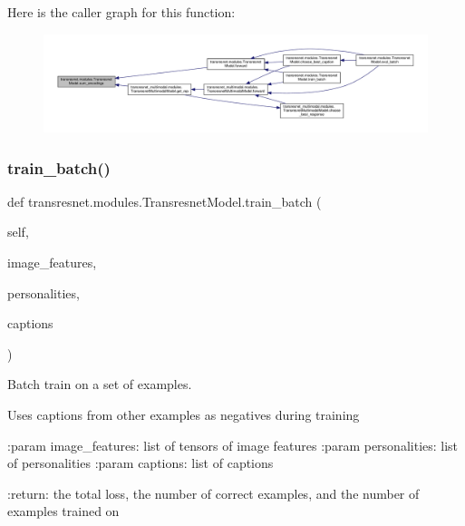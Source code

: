 Here is the caller graph for this function\+:
\nopagebreak
\begin{figure}[H]
\begin{center}
\leavevmode
\includegraphics[width=350pt]{classtransresnet_1_1modules_1_1TransresnetModel_ad510db9128829888d74b02e520cad7b9_icgraph}
\end{center}
\end{figure}
\mbox{\label{classtransresnet_1_1modules_1_1TransresnetModel_aedf5402061ce43a2b594eb9c8a374738}} 
\subsubsection{\texorpdfstring{train\+\_\+batch()}{train\_batch()}}
{\footnotesize\ttfamily def transresnet.\+modules.\+Transresnet\+Model.\+train\+\_\+batch (\begin{DoxyParamCaption}\item[{}]{self,  }\item[{}]{image\+\_\+features,  }\item[{}]{personalities,  }\item[{}]{captions }\end{DoxyParamCaption})}

\begin{DoxyVerb}Batch train on a set of examples.

Uses captions from other examples as negatives during training

:param image_features:
    list of tensors of image features
:param personalities:
    list of personalities
:param captions:
    list of captions

:return:
    the total loss, the number of correct examples, and the number of
    examples trained on
\end{DoxyVerb}
 

